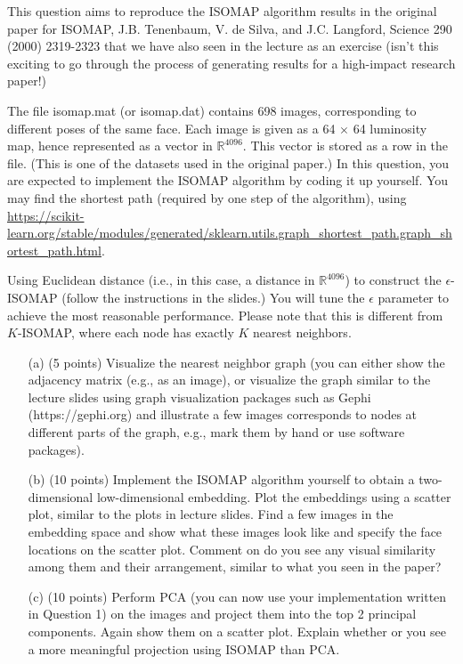 \documentclass[twoside,10pt]{article}
\begin{document}
This question aims to reproduce the ISOMAP algorithm results in the original paper for ISOMAP, J.B. Tenenbaum, V. de Silva, and J.C. Langford, Science 290 (2000) 2319-2323 that we have also seen in the lecture as an exercise (isn't this exciting to go through the process of generating results for a high-impact research paper!) 


The file \textsf{isomap.mat} (or \textsf{isomap.dat}) contains 698 images, corresponding to different poses of the same face. Each image is given as a 64 $\times$ 64 luminosity map, hence represented as a vector in $\mathbb R^{4096}$. This vector is stored as a row in the file. (This is one of the datasets used in the original paper.) In this question, you are expected to implement the ISOMAP algorithm by coding it up yourself. You may find the shortest path (required by one step of the algorithm), using \url{https://scikit-learn.org/stable/modules/generated/sklearn.utils.graph\_shortest\_path.graph\_shortest_path.html}. 

Using Euclidean distance (i.e., in this case, a distance in $\mathbb R^{4096}$) to construct the $\epsilon$-ISOMAP (follow the instructions in the slides.) You will tune the $\epsilon$ parameter to achieve the most reasonable performance. Please note that this is different from $K$-ISOMAP, where each node has exactly $K$ nearest neighbors.

\begin{enumerate} 

\item[(a)] (5 points) Visualize the nearest neighbor graph (you can either show the adjacency matrix (e.g., as an image), or visualize the graph similar to the lecture slides using graph visualization packages such as Gephi (\textsf{https://gephi.org}) and illustrate a few images corresponds to nodes at different parts of the graph, e.g., mark them by hand or use software packages).
 
\item[(b)] (10 points) Implement the ISOMAP algorithm yourself to obtain a two-dimensional low-dimensional embedding. Plot the embeddings using a scatter plot, similar to the plots in lecture slides. Find a few images in the embedding space and show what these images look like and specify the face locations on the scatter plot. Comment on do you see any visual similarity among them and their arrangement, similar to what you seen in the paper?

\item[(c)] (10 points) Perform PCA (you can now use your implementation written in Question 1) on the images and project them into the top 2 principal components. Again show them on a scatter plot. Explain whether or you see a more meaningful projection using ISOMAP than PCA. 

\end{enumerate}
\end{document}
